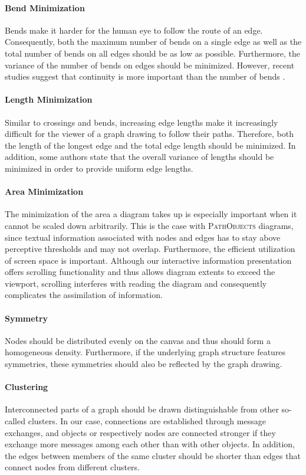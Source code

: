 \paragraph{Bend Minimization} Bends make it harder for the human eye to follow the route of an edge.
Consequently, both the maximum number of bends on a single edge as well as the total number of bends on all edges should be as low as possible.
Furthermore, the variance of the number of bends on edges should be minimized.
However, recent studies suggest that continuity is more important than the number of bends \cite{diehl_software_2007}.

\paragraph{Length Minimization} Similar to crossings and bends, increasing edge lengths make it increasingly difficult for the viewer of a graph drawing to follow their paths.
Therefore, both the length of the longest edge and the total edge length should be minimized.
In addition, some authors state that the overall variance of lengths should be minimized in order to provide uniform edge lengths.

\paragraph{Area Minimization} The minimization of the area a diagram takes up is especially important when it cannot be scaled down arbitrarily.
This is the case with \textsc{PathObjects} diagrams, since textual information associated with nodes and edges has to stay above perceptive thresholds and may not overlap.
Furthermore, the efficient utilization of screen space is important.
Although our interactive information presentation offers scrolling functionality and thus allows diagram extents to exceed the viewport, scrolling interferes with reading the diagram and consequently complicates the assimilation of information.

\paragraph{Symmetry} Nodes should be distributed evenly on the canvas and thus should form a homogeneous density.
Furthermore, if the underlying graph structure features symmetries, these symmetries should also be reflected by the graph drawing.

\paragraph{Clustering} Interconnected parts of a graph should be drawn distinguishable from other so-called clusters.
In our case, connections are established through message exchanges, and objects or respectively nodes are connected stronger if they exchange more messages among each other than with other objects.
In addition, the edges between members of the same cluster should be shorter than edges that connect nodes from different clusters.

